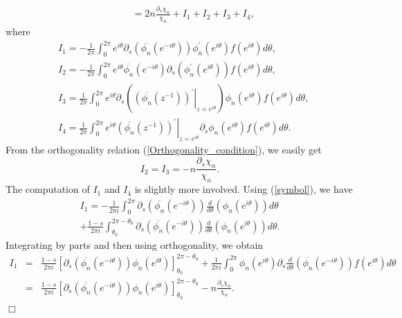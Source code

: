 \documentclass[11pt,fleqn]{article}
\numberwithin{equation}{section}
\newenvironment{proof}%
    {\rm \trivlist \item[\hskip \labelsep{\bf Proof. }]}%
    {\hspace*{\fill}$\Box$\endtrivlist}
\begin{document}
\begin{proof}
\begin{align}
& \qquad =  2n \frac{\partial_{s} \chi_{n}}{\chi_{n}} + I_{1} + I_{2} + I_{3} + I_{4},
\label{diffid2}\end{align}
where
\begin{align}
&I_{1}  =  - \frac{1}{2\pi} \int_{0}^{2\pi} e^{i\theta} \partial_{s} \left( \overline{\phi_{n}} (e^{-i\theta}) \right) \phi_{n}^{\prime} (e^{i\theta}) f(e^{i\theta})d\theta,\\
&I_{2} = -\frac{1}{2\pi} \int_{0}^{2\pi} e^{i\theta} \overline{\phi_{n}}(e^{-i\theta})  \partial_{s} \left( \phi_{n}^{\prime}(e^{i\theta}) \right) f(e^{i\theta})d\theta,\\
&I_{3} = \frac{1}{2\pi} \int_{0}^{2\pi} e^{i\theta} \partial_{s} \left( \left. \left( \overline{\phi_{n}}(z^{-1}) \right)^{\prime} \right|_{z=e^{i\theta}} \right) \phi_{n}(e^{i\theta}) f(e^{i\theta})d\theta,\\
&I_4=\frac{1}{2\pi} \int_{0}^{2\pi} e^{i\theta} \left. \left( \overline{\phi_{n}}(z^{-1}) \right)^{\prime} \right|_{z=e^{i\theta}} \partial_{s} \phi_{n}(e^{i\theta}) f(e^{i\theta})d\theta.
\end{align}
From the orthogonality relation (\ref{Orthogonality_condition}), we easily get
\begin{equation}
I_2=I_3=-n \frac{\partial_s\chi_{n}}{\chi_{n}}.\label{I23}
\end{equation}
The computation of $I_1$ and $I_4$ is slightly more involved. Using (\ref{symbol}), we have
\begin{multline} 
I_{1}  =  - \frac{1}{2\pi i} \int_{0}^{2\pi} \partial_{s} \left( \overline{\phi_{n}} (e^{-i\theta}) \right) \frac{d}{d\theta} \left( \phi_{n} (e^{i\theta}) \right) d\theta \\
+ \frac{1-s}{2\pi i} \int_{\theta_0}^{2\pi-\theta_0} \partial_{s} \left( \overline{\phi_{n}} (e^{-i\theta}) \right) \frac{d}{d\theta} \left( \phi_{n} (e^{i\theta}) \right) d\theta.
\end{multline}
Integrating by parts and then using orthogonality, we obtain
\begin{eqnarray}
I_1&=&\frac{1-s}{2\pi i} \left[ \partial_{s} \left( \overline{\phi_{n}}(e^{-i\theta}) \right) \phi_{n}(e^{i\theta}) \right]_{\theta_{0}}^{2\pi -\theta_{0}} + \frac{1}{2\pi i} \int_{0}^{2\pi} \phi_{n}(e^{i\theta}) \partial_{s}\frac{d}{d\theta} \left( \overline{\phi_{n}} (e^{-i\theta}) \right) f(e^{i\theta}) d\theta\nonumber \\&=& \frac{1-s}{2\pi i} \left[ \partial_{s} \left( \overline{\phi_{n}}(e^{-i\theta}) \right) \phi_{n}(e^{i\theta}) \right]_{\theta_{0}}^{2\pi -\theta_{0}} - n \frac{\partial_s \chi_{n}}{\chi_{n}}.\label{I1}

\end{eqnarray}
\end{proof}
\end{document}
